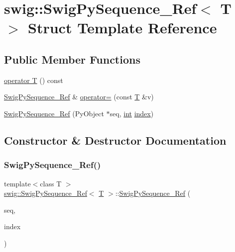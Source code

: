 \hypertarget{structswig_1_1_swig_py_sequence___ref}{}\section{swig\+:\+:Swig\+Py\+Sequence\+\_\+\+Ref$<$ T $>$ Struct Template Reference}
\label{structswig_1_1_swig_py_sequence___ref}
\subsection*{Public Member Functions}
\begin{DoxyCompactItemize}
\item 
\hyperlink{structswig_1_1_swig_py_sequence___ref_a148e950c46eb0a1531513453dfc35482}{operator T} () const
\item 
\hyperlink{structswig_1_1_swig_py_sequence___ref}{Swig\+Py\+Sequence\+\_\+\+Ref} \& \hyperlink{structswig_1_1_swig_py_sequence___ref_a71732475dadcaebf7e61bd5377199ee2}{operator=} (const \hyperlink{fmt_8h_a0acb682b8260ab1c60b918599864e2e5}{T} \&v)
\item 
\hyperlink{structswig_1_1_swig_py_sequence___ref_a37931833739c148cd4feebe0643d5f2a}{Swig\+Py\+Sequence\+\_\+\+Ref} (Py\+Object $\ast$seq, \hyperlink{lp__lib_8h_adeb9ec6400320e4923ac9d836d509ddb}{int} \hyperlink{lp__lib_8h_a1499949ec4dbbc5290ece2ac210bba35}{index})
\end{DoxyCompactItemize}


\subsection{Constructor \& Destructor Documentation}
\mbox{\label{structswig_1_1_swig_py_sequence___ref_a37931833739c148cd4feebe0643d5f2a}} 
\subsubsection{\texorpdfstring{Swig\+Py\+Sequence\+\_\+\+Ref()}{SwigPySequence\_Ref()}}
{\footnotesize\ttfamily template$<$class T $>$ \\
\hyperlink{structswig_1_1_swig_py_sequence___ref}{swig\+::\+Swig\+Py\+Sequence\+\_\+\+Ref}$<$ \hyperlink{fmt_8h_a0acb682b8260ab1c60b918599864e2e5}{T} $>$\+::\hyperlink{structswig_1_1_swig_py_sequence___ref}{Swig\+Py\+Sequence\+\_\+\+Ref} (\begin{DoxyParamCaption}\item[{Py\+Object $\ast$}]{seq,  }\item[{\hyperlink{lp__lib_8h_adeb9ec6400320e4923ac9d836d509ddb}{int}}]{index }\end{DoxyParamCaption})\hspace{0.3cm}{\ttfamily [inline]}}



